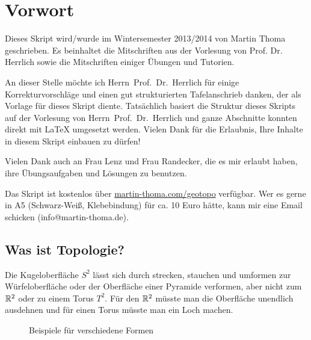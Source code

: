 \chapter*{Vorwort}
Dieses Skript wird/wurde im Wintersemester 2013/2014
von Martin Thoma geschrieben. Es beinhaltet die Mitschriften aus
der Vorlesung von Prof. Dr. Herrlich sowie die Mitschriften einiger
Übungen und Tutorien.

An dieser Stelle möchte ich Herrn~Prof.~Dr.~Herrlich für einige 
Korrekturvorschläge und einen gut strukturierten Tafelanschrieb 
danken, der als Vorlage für dieses Skript diente. Tatsächlich basiert
die Struktur dieses Skripts auf der Vorlesung von Herrn~Prof.~Dr.~Herrlich
und ganze Abschnitte konnten direkt mit \LaTeX{} umgesetzt werden.
Vielen Dank für die Erlaubnis, Ihre Inhalte in diesem Skript einbauen
zu dürfen!

Vielen Dank auch an Frau Lenz und Frau Randecker, die es mir erlaubt 
haben, ihre Übungsaufgaben und Lösungen zu benutzen.

Das Skript ist kostenlos über \href{http://martin-thoma.com/geotopo/}{martin-thoma.com/geotopo}
verfügbar. Wer es gerne in A5 (Schwarz-Weiß, Klebebindung) für ca. 10 Euro hätte, 
kann mir eine Email schicken (info@martin-thoma.de).

\section*{Was ist Topologie?}

Die Kugeloberfläche $S^2$ lässt sich durch strecken, stauchen
und umformen zur Würfeloberfläche oder
der Oberfläche einer Pyramide verformen, aber nicht zum $\mdr^2$
oder zu einem Torus $T^2$. Für den $\mdr^2$ müsste man die Oberfläche
unendlich ausdehnen und für einen Torus müsste man ein Loch machen.

\begin{figure}[ht]
    \centering
    \subfloat[$S^2$]{
        
        \label{fig:s2}
    }%
    \subfloat[Würfel]{
        
        \label{fig:cube}
    }%
    \subfloat[Pyramide]{
        
        \label{fig:pyramide}
    }

    \subfloat[$\mdr^2$]{
        
        \label{fig:plane-r2}
    }%
    \label{Formen}
    \caption{Beispiele für verschiedene Formen}
\end{figure}

